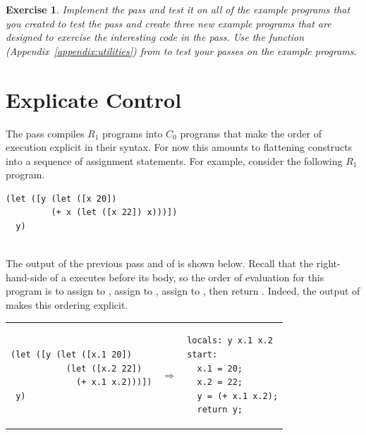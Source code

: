 \documentclass[11pt]{book}
\newtheorem{exercise}[theorem]{Exercise}
\begin{document}
\begin{exercise}
\normalfont Implement the  pass and test
it on all of the example programs that you created to test the
 pass and create three new example programs that are
designed to exercise the interesting code in the
 pass. Use the  function
(Appendix~\ref{appendix:utilities}) from  to test
your passes on the example programs.
\end{exercise}


\section{Explicate Control}
\label{sec:explicate-control-r1}

The  pass compiles $R_1$ programs into $C_0$
programs that make the order of execution explicit in their
syntax. For now this amounts to flattening  constructs into a
sequence of assignment statements. For example, consider the following
$R_1$ program.\\
\begin{minipage}{0.96\textwidth}
\begin{lstlisting}
(let ([y (let ([x 20])
         (+ x (let ([x 22]) x)))])
  y)
\end{lstlisting}
\end{minipage}\\
%
The output of the previous pass and of  is
shown below. Recall that the right-hand-side of a  executes
before its body, so the order of evaluation for this program is to
assign  to , assign  to , assign
 to , then return . Indeed, the
output of  makes this ordering explicit.\\
\begin{tabular}{lll}
\begin{minipage}{0.4\textwidth}
\begin{lstlisting}
(let ([y (let ([x.1 20]) 
           (let ([x.2 22])
             (+ x.1 x.2)))])
 y)
\end{lstlisting}
\end{minipage}
&
$\Rightarrow$
&
\begin{minipage}{0.4\textwidth}
\begin{lstlisting}
locals: y x.1 x.2
start:
  x.1 = 20;
  x.2 = 22;
  y = (+ x.1 x.2);
  return y;
\end{lstlisting}
\end{minipage}
\end{tabular}
\end{document}
